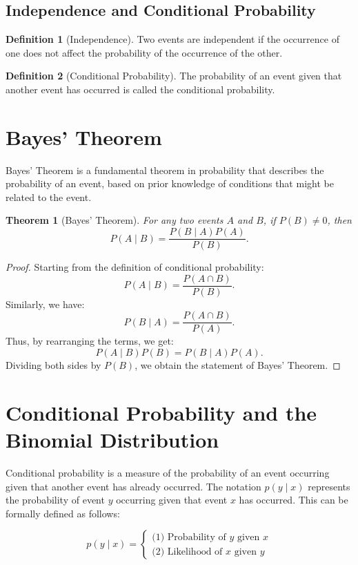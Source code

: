 \documentclass[12pt,openany]{book}
\newtheorem{theorem}{Theorem}[chapter]
\theoremstyle{definition}
\newtheorem{definition}{Definition}[chapter]
\begin{document}
	\subsection{Independence and Conditional Probability}
	\begin{definition}[Independence]
		Two events are independent if the occurrence of one does not affect the probability of the occurrence of the other.
	\end{definition}
	
	\begin{definition}[Conditional Probability]
		The probability of an event given that another event has occurred is called the conditional probability.
	\end{definition}
	
	\section{Bayes' Theorem}
	Bayes' Theorem is a fundamental theorem in probability that describes the probability of an event, based on prior knowledge of conditions that might be related to the event.
	
	\begin{theorem}[Bayes' Theorem]
		\label{thm:bayes}
		For any two events $A$ and $B$, if $P(B) \neq 0$, then
		\[
		P(A\mid B) = \frac{P(B\mid A)P(A)}{P(B)}.
		\]
	\end{theorem}
	
	\begin{proof}
		Starting from the definition of conditional probability:
		\[
		P(A\mid B) = \frac{P(A \cap B)}{P(B)}.
		\]
		Similarly, we have:
		\[
		P(B\mid A) = \frac{P(A \cap B)}{P(A)}.
		\]
		Thus, by rearranging the terms, we get:
		\[
		P(A\mid B)P(B) = P(B\mid A)P(A).
		\]
		Dividing both sides by $P(B)$, we obtain the statement of Bayes' Theorem.
	\end{proof}
	\section{Conditional Probability and the Binomial Distribution}
	Conditional probability is a measure of the probability of an event occurring given that another event has already occurred. The notation $p(y \mid x)$ represents the probability of event $y$ occurring given that event $x$ has occurred. This can be formally defined as follows:
	
	\[
	p(y\mid x)=
	\begin{cases}
		\text{(1) Probability of $y$ given $x$} \\
		\text{(2) Likelihood of $x$ given $y$}
	\end{cases}
	\]
	
\end{document}
